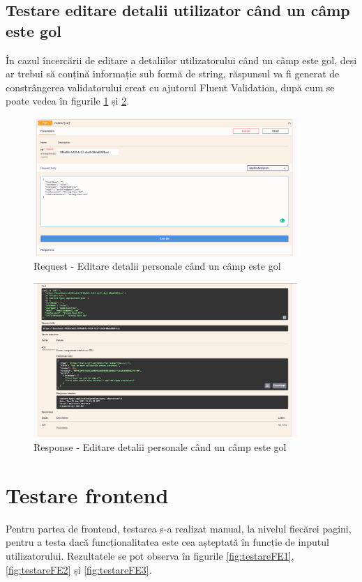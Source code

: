 \subsection{Testare editare detalii utilizator când un câmp este gol}
În cazul încercării de editare a detaliilor utilizatorului când un câmp este gol, deși ar trebui să conțină informație sub formă de string, răspunsul va fi generat de constrângerea validatorului creat cu ajutorul Fluent Validation,
după cum se poate vedea în figurile \ref{fig:editWrong1} și \ref{fig:editWrong2}.
\begin{figure}[H]
	\centering
	\includegraphics[width=100mm, scale=2]{figs/editWrong1.png}
    \caption{Request - Editare detalii personale când un câmp este gol}
	\label{fig:editWrong1}
\end{figure}

\begin{figure}[H]
	\centering
	\includegraphics[width=100mm, scale=2]{figs/editWrong2.png}
    \caption{Response - Editare detalii personale când un câmp este gol}
	\label{fig:editWrong2}
\end{figure}


\section{Testare frontend}
Pentru partea de frontend, testarea s-a realizat manual, la nivelul fiecărei pagini, pentru a testa dacă funcționalitatea este cea așteptată în funcție de inputul utilizatorului.
Rezultatele se pot observa în figurile \ref{fig:testareFE1}, \ref{fig:testareFE2} și \ref{fig:testareFE3}.

